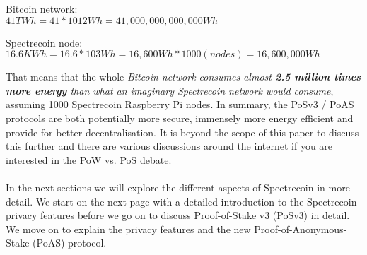 \vspace{5mm} %

Bitcoin network:\\
$41 TWh = 41*1012 Wh = 41,000,000,000,000 Wh$

\vspace{5mm} %

Spectrecoin node:\\
$16.6 KWh = 16.6 * 103 Wh = 16,600 Wh * 1000 (nodes) = 16,600,000 Wh$

\vspace{5mm} %

\noindent
That means that the whole \textit{Bitcoin network consumes almost \textbf{2.5 million times
more energy} than what an imaginary Spectrecoin network would consume}, assuming
1000 Spectrecoin Raspberry Pi nodes.
\newpage
\noindent
In summary, the PoSv3 / PoAS protocols are both potentially more secure,
immensely more energy efficient and provide for better decentralisation.
It is beyond the scope of this paper to discuss this further and there are
various discussions around the internet if you are interested in the PoW vs.
PoS debate.
\\
\\
\noindent
In the next sections we will explore the different aspects of Spectrecoin in
more detail. We start on the next page with a detailed introduction to the
Spectrecoin privacy features before we go on to discuss Proof-of-Stake v3
(PoSv3) in detail. We move on to explain the privacy features and the new
Proof-of-Anonymous-Stake (PoAS) protocol.